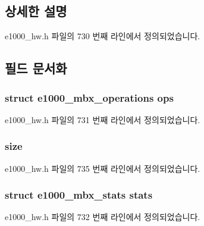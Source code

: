 \subsection{상세한 설명}


e1000\+\_\+hw.\+h 파일의 730 번째 라인에서 정의되었습니다.



\subsection{필드 문서화}
\subsubsection[{\texorpdfstring{ops}{ops}}]{\setlength{\rightskip}{0pt plus 5cm}struct {\bf e1000\+\_\+mbx\+\_\+operations} ops}\hypertarget{structe1000__mbx__info_a008cc1935ad11e1d606524f05e5d164b}{}\label{structe1000__mbx__info_a008cc1935ad11e1d606524f05e5d164b}


e1000\+\_\+hw.\+h 파일의 731 번째 라인에서 정의되었습니다.

\subsubsection[{\texorpdfstring{size}{size}}]{ size}\hypertarget{structe1000__mbx__info_a156e4b9881ca413f29004c8138d78c55}{}\label{structe1000__mbx__info_a156e4b9881ca413f29004c8138d78c55}


e1000\+\_\+hw.\+h 파일의 735 번째 라인에서 정의되었습니다.

\subsubsection[{\texorpdfstring{stats}{stats}}]{\setlength{\rightskip}{0pt plus 5cm}struct {\bf e1000\+\_\+mbx\+\_\+stats} stats}\hypertarget{structe1000__mbx__info_a0896d773a3bcfce4ce1e9c43ba7e19a7}{}\label{structe1000__mbx__info_a0896d773a3bcfce4ce1e9c43ba7e19a7}


e1000\+\_\+hw.\+h 파일의 732 번째 라인에서 정의되었습니다.

